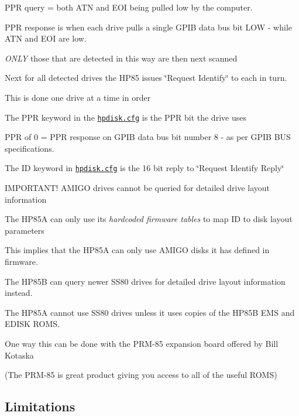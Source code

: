 \begin{DoxyItemize}
\begin{DoxyItemize}
\item P\+PR query = both A\+TN and E\+OI being pulled low by the computer.
\item P\+PR response is when each drive pulls a single G\+P\+IB data bus bit L\+OW -\/ while A\+TN and E\+OI are low.
\begin{DoxyItemize}
\item {\itshape O\+N\+LY} those that are detected in this way are then next scanned
\end{DoxyItemize}
\item Next for all detected drives the H\+P85 issues \char`\"{}\+Request Identify\char`\"{} to each in turn.
\begin{DoxyItemize}
\item This is done one drive at a time in order
\item The P\+PR keyword in the \href{sdcard/hpdisk.cfg}{\tt hpdisk.\+cfg} is the P\+PR bit the drive uses
\begin{DoxyItemize}
\item P\+PR of 0 = P\+PR response on G\+P\+IB data bus bit number 8 -\/ as per G\+P\+IB B\+US specifications.
\end{DoxyItemize}
\item The ID keyword in \href{sdcard/hpdisk.cfg}{\tt hpdisk.\+cfg} is the 16 bit reply to \char`\"{}\+Request Identify Reply\char`\"{}
\begin{DoxyItemize}
\item I\+M\+P\+O\+R\+T\+A\+N\+T! A\+M\+I\+GO drives cannot be queried for detailed drive layout information
\begin{DoxyItemize}
\item The H\+P85A can only use its {\itshape hardcoded firmware tables} to map ID to disk layout parameters
\item This implies that the H\+P85A can only use A\+M\+I\+GO disks it has defined in firmware.
\end{DoxyItemize}
\item The H\+P85B can query newer S\+S80 drives for detailed drive layout information instead.
\item The H\+P85A cannot use S\+S80 drives unless it uses copies of the H\+P85B E\+MS and E\+D\+I\+SK R\+O\+MS.
\begin{DoxyItemize}
\item One way this can be done with the P\+R\+M-\/85 expansion board offered by Bill Kotaska
\begin{DoxyItemize}
\item (The P\+R\+M-\/85 is great product giving you access to all of the useful R\+O\+MS) 

 \subsection*{Limitations}
\end{DoxyItemize}
\end{DoxyItemize}
\end{DoxyItemize}
\end{DoxyItemize}
\end{DoxyItemize}
\end{DoxyItemize}

